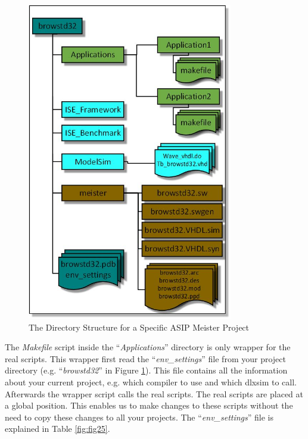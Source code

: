 \begin{figure}[!htb]
	\centering
	\includegraphics[width=0.8\textwidth]{src/images/2-3.png}
	\caption{The Directory Structure for a Specific ASIP Meister Project}
	\label{fig:fig23}
\end{figure}
The \emph{Makefile} script inside the ``\emph{Applications}'' directory
is only wrapper for the real scripts. This wrapper first read the
``\emph{env\_settings}'' file from your project directory (e.g.
``\emph{browstd32}'' in Figure \ref{fig:fig23}). This
file contains all the information about your current project, e.g. which
compiler to use and which dlxsim to call. Afterwards the wrapper script
calls the real scripts. The real scripts are placed at a global
position. This enables us to make changes to these scripts without the
need to copy these changes to all your projects. The
``\emph{env\_settings}'' file is explained in Table \ref{fig:fig25}.

